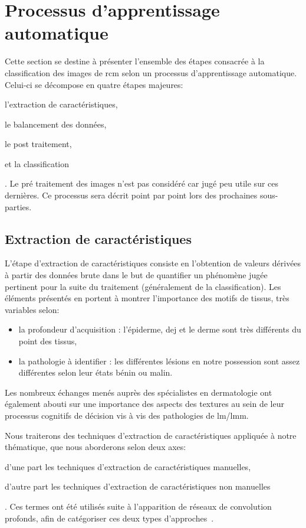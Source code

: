 \newpage

\section{Processus d'apprentissage automatique}
Cette section se destine à présenter l'ensemble des étapes consacrée à la classification des images de \gls{rcm} selon un processus d'apprentissage automatique. Celui-ci se décompose en quatre étapes majeures:
\begin{inlinerate}
    \item l'extraction de caractéristiques,
    \item le balancement des données,
    \item le post traitement,
    \item et la classification
\end{inlinerate}.
Le pré traitement des images n'est pas considéré car jugé peu utile sur ces dernières. Ce processus sera décrit point par point lors des prochaines sous-parties.

\subsection{Extraction de caractéristiques}
L'étape d'extraction de caractéristiques consiste en l'obtention de valeurs dérivées à partir des données brute dans le but de quantifier un phénomène jugée pertinent pour la suite du traitement (généralement de la classification). Les éléments présentés en  portent à montrer l'importance des motifs de tissus, très variables selon:
\begin{itemize}
    \item la profondeur d'acquisition : l'épiderme, \gls{dej} et le derme sont très différents du point des tissus,
    \item la pathologie à identifier : les différentes lésions en notre possession sont assez différentes selon leur états bénin ou malin.
\end{itemize}\par

Les nombreux échanges menés auprès des spécialistes en dermatologie ont également abouti sur une importance des aspects des textures au sein de leur processus cognitifs de décision vis à vis des pathologies de \gls{lm}/\gls{lmm}.\par

Nous traiterons des techniques d'extraction de caractéristiques appliquée à notre thématique, que nous aborderons selon deux axes:
\begin{inlinerate}
    \item d'une part les techniques d'extraction de caractéristiques manuelles,
    \item d'autre part les techniques d'extraction de caractéristiques non manuelles
\end{inlinerate}. Ces termes ont été utilisés suite à l'apparition de réseaux de convolution profonds, afin de catégoriser ces deux types d'approches~\cite{Nanni2017}.\par


